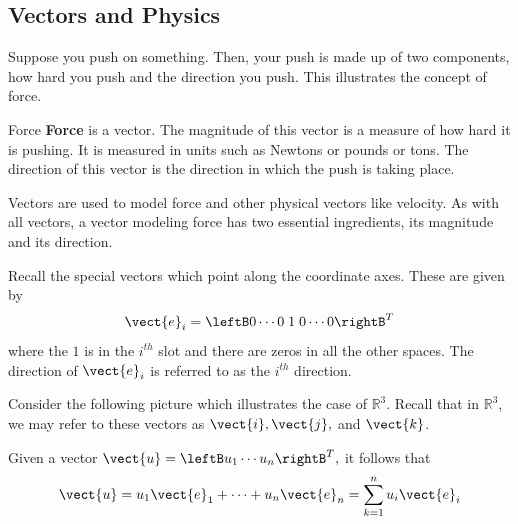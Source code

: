 \subsection{Vectors and Physics}

Suppose you push
on something. Then, your push is made up of two components, how hard you push and the direction you push. This illustrates the concept of force.

\begin{definition}{Force}\label{def:force}
\textbf{Force}
 is a vector. The magnitude of this vector is a measure of how
hard it is pushing. It is measured in units such as Newtons  or pounds or
tons. The direction of this vector is the direction in which the push is taking place.
\end{definition}

Vectors are used to model force and other physical vectors like velocity.
 As with all vectors, a vector modeling force has two essential
ingredients, its magnitude and its direction.

Recall the special vectors which point along the coordinate axes.
These are given by 
\begin{equation*}
\vect{e}_{i} = \leftB 0 \cdots 0 \; 1 \; 0 \cdots 0 \rightB^T
\end{equation*}
where the $1$ is in the $i^{th}$ slot and there are zeros in all the other
spaces. The direction of $\vect{e}_{i}$ is referred to as the $i^{th}$ direction.

Consider the following picture which illustrates the case of $\mathbb{R}^{3}.$ 
Recall that in $\mathbb{R}^3$, we may refer to these vectors as $\vect{i}, \vect{j},$ and $\vect{k}$. 

\begin{center}
\end{center}

Given a vector $\vect{u}=\leftB u_{1} \cdots u_{n}\rightB^T ,$ it follows
that
\begin{equation*}
\vect{u}=u_{1}\vect{e}_{1}+\cdots +u_{n}\vect{e}_{n}=
\sum_{k=1}^{n}u_{i}\vect{e}_{i}
\end{equation*}


